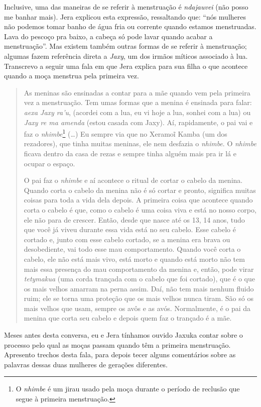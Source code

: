 Inclusive, uma das maneiras de se referir à menstruação é \emph{ndajauvei} (não
posso me banhar mais). Jera explicou esta expressão, ressaltando que:
``nós mulheres não podemos tomar banho de água fria ou corrente quando
estamos menstruadas. Lava do pescoço pra baixo, a cabeça só pode lavar
quando acabar a menstruação''. Mas existem também outras formas de se
referir à menstruação; algumas fazem referência direta a \emph{Jaxy}, um dos
irmãos míticos associado à lua. Transcrevo a seguir uma fala em que
Jera explica para sua filha o que acontece quando a moça menstrua pela
primeira vez. 

\begin{quotation}
\noindent
As meninas são ensinadas a contar para a mãe quando vem pela primeira
vez a menstruação. Tem umas formas que a menina é ensinada para falar:
\emph{aexa Jaxy ra’u}, (acordei com a lua, eu vi hoje a lua, sonhei com a lua)
ou \emph{Jaxy re ma amenda} (estou casada com Jaxy). Aí, rapidamente, o pai
vai e faz o \emph{nhimbe}\footnote{O \emph{nhimbe} é um jirau usado pela moça durante
o período de reclusão que segue à primeira menstruação.} (\ldots{}) Eu
sempre via que no Xeramoĩ Kamba (um dos rezadores), que tinha muitas
meninas, ele nem desfazia o \emph{nhimbe}. O \emph{nhimbe} ficava dentro da casa de
rezas e sempre tinha alguém mais pra ir lá e ocupar o espaço. 

\noindent
O pai faz o \emph{nhimbe} e aí acontece o ritual de cortar o cabelo da menina.
Quando corta o cabelo da menina não é só cortar e pronto, significa
muitas coisas para toda a vida dela depois. A primeira coisa que
acontece quando corta o cabelo é que, como o cabelo é uma coisa viva e
está no nosso corpo, ele não para de crescer. Então, desde que nasce
até os 13, 14 anos, tudo que você já viveu durante essa vida está no
seu cabelo. Esse cabelo é cortado e, junto com esse cabelo cortado, se
a menina era brava ou desobediente, vai todo esse mau comportamento.
Quando você corta o cabelo, ele não está mais vivo, está morto e quando
está morto não tem mais essa presença do mau comportamento da menina e,
então, pode virar \emph{tetymakua} (uma corda trançada com o cabelo que foi
cortado), que é o que os mais velhos amarram na perna assim. Daí, não
tem mais nenhum fluido ruim; ele se torna uma proteção que os mais
velhos nunca tiram. São só os mais velhos que usam, sempre os avôs e as
avós. Normalmente, é o pai da menina que corta seu cabelo e depois quem
faz o trançado é a mãe. 

\end{quotation}
Meses antes desta conversa, eu e Jera tínhamos ouvido Jaxuka contar
sobre o processo pelo qual as moças passam quando têm a primeira
menstruação. Apresento trechos desta fala, para depois tecer alguns
comentários sobre as palavras dessas duas mulheres de gerações
diferentes. 

